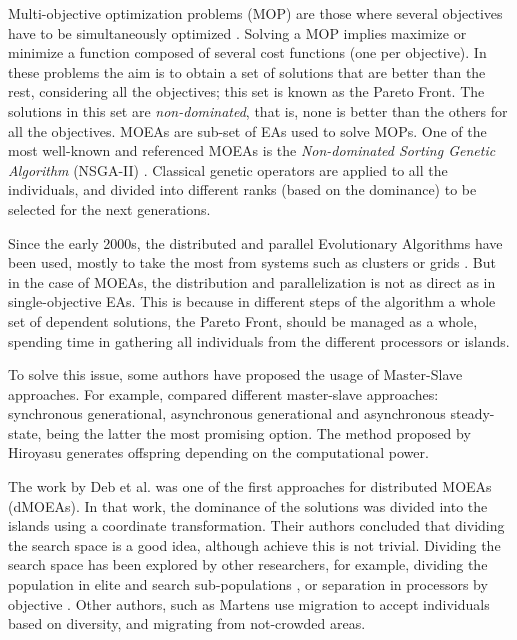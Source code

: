 \documentclass[preprint]{elsarticle}
\begin{document}
Multi-objective optimization problems (MOP) are those where several objectives have to be simultaneously optimized \citep{Mora13paretobased}. Solving a MOP implies maximize or minimize a function composed of several cost functions (one per objective). In these problems the aim is to obtain a set of solutions that are better than the rest, considering all the objectives; this set is known as the Pareto Front. The solutions in this set are {\em non-dominated}, that is, none is better than the others for all the objectives. MOEAs are sub-set of EAs used to solve MOPs. One of the most well-known and referenced MOEAs \citep{Dorronsoro13superlinear} is the {\em Non-dominated Sorting Genetic Algorithm} (NSGA-II) \citep{Deb00NSGAII}. Classical genetic operators are applied to all the individuals, and divided into different ranks (based on the dominance) to be selected for the next generations.


Since the early 2000s, the distributed and parallel Evolutionary Algorithms have been used, mostly to take the most from systems such as clusters or grids \citep{Talbi08Parallel}. But in the case of MOEAs, the distribution and parallelization is not as direct as in single-objective EAs. This is because in different steps of the algorithm a whole set of dependent solutions, the Pareto Front, should be managed as a whole, spending time in gathering all individuals from the different processors or islands.

To solve this issue, some authors have proposed the usage of Master-Slave approaches. For example,  \citep{Durillo08masterslave} compared different master-slave approaches: synchronous generational, asynchronous generational and asynchronous steady-state, being the latter the most promising option. The method proposed by Hiroyasu \citep{Hiroyasu07discussion} generates offspring depending on the computational power.

The work by Deb et al. \citep{Deb03distributed} was one of the first approaches for distributed MOEAs (dMOEAs). In that work, the dominance of the solutions was divided into the islands using a coordinate transformation. Their authors concluded that dividing the search space is a good idea, although achieve this is not trivial. Dividing the search space has been explored by other researchers, for example, dividing the population in elite and search sub-populations \citep{Wang09parallel}, or separation in processors by objective \citep{Xiao03specialized}. Other authors, such as Martens \citep{Martens13asynchronous} use migration to accept individuals based on diversity, and migrating from not-crowded areas.
\end{document}
